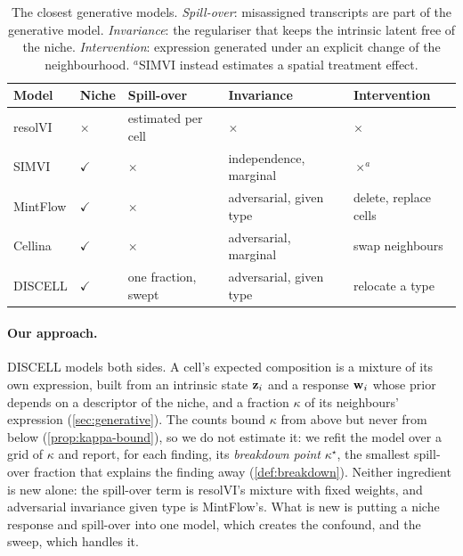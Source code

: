 \begin{table}[t]
\centering
\caption{The closest generative models. \emph{Spill-over}: misassigned transcripts are part of the generative model. \emph{Invariance}: the regulariser that keeps the intrinsic latent free of the niche. \emph{Intervention}: expression generated under an explicit change of the neighbourhood. $^a$SIMVI instead estimates a spatial treatment effect.}
\label{tab:related}
\footnotesize
\setlength{\tabcolsep}{2.5pt}
\begin{tabular}{@{}l>{\centering\arraybackslash}p{}>{\raggedright\arraybackslash}p{}>{\raggedright\arraybackslash}p{}>{\raggedright\arraybackslash}p{}@{}}
\toprule
Model & Niche & Spill-over & Invariance & Intervention \\
\midrule
resolVI & $\times$ & estimated per cell & $\times$ & $\times$ \\
SIMVI & $\checkmark$ & $\times$ & independence, marginal & $\times^a$ \\
MintFlow & $\checkmark$ & $\times$ & adversarial, given type & delete, replace cells \\
Cellina & $\checkmark$ & $\times$ & adversarial, marginal & swap neighbours \\
DISCELL & $\checkmark$ & one fraction, swept & adversarial, given type & relocate a type \\
\bottomrule
\end{tabular}
\end{table}

\paragraph{Our approach.}
DISCELL models both sides. A cell's expected composition is a mixture of its own expression, built from an intrinsic state $\mathbf{z}_i$ and a response $\mathbf{w}_i$ whose prior depends on a descriptor of the niche, and a fraction $\kappa$ of its neighbours' expression (\cref{sec:generative}). The counts bound $\kappa$ from above but never from below (\cref{prop:kappa-bound}), so we do not estimate it: we refit the model over a grid of $\kappa$ and report, for each finding, its \emph{breakdown point} $\kappa^\star$, the smallest spill-over fraction that explains the finding away (\cref{def:breakdown}). Neither ingredient is new alone: the spill-over term is resolVI's mixture with fixed weights, and adversarial invariance given type is MintFlow's. What is new is putting a niche response and spill-over into one model, which creates the confound, and the sweep, which handles it.

